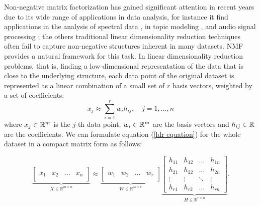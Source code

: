 Non-negative matrix factorization has gained significant attention in recent years due to its wide range of applications in data analysis, for instance it find applications in the analysis of spectral data \cite{boardman1995mapping}, in topic modeling \cite{arora2013practical}, and audio signal processing \cite{fevotte2009nonnegative}; the others traditional linear dimensionality reduction techniques often fail to capture non-negative structures inherent in many datasets. NMF provides a natural framework for this task.
In linear dimensionality reduction problems, that is, finding a low-dimensional representation of the data that is close to the underlying structure, 
each data point of the original dataset is represented as a linear combination of a small set of $r$ basis vectors, weighted by a set of coefficients:
\begin{equation}\label{ldr equation}
    x_j \approx \sum_{i=1}^r w_i h_{ij}, \quad j = 1, \dots, n
\end{equation}
where $x_j \in \mathbb{R}^m$ is the $j$-th data point, $w_i \in \mathbb{R}^m$ are the basis vectors and $h_{ij} \in \mathbb{R}$ are the coefficients.
We can formulate equation (\ref{ldr equation}) for the whole dataset in a compact matrix form as follows:

\begin{equation}\label{ldr matrix equation}
\underbrace{\begin{bmatrix}
& & & \\
x_1 & x_2 & \dots & x_n \\
& & & 
\end{bmatrix}}_{X \in \mathbb{R}^{m \times n}}
\approx
\underbrace{\begin{bmatrix}
& & & \\
w_1 & w_2 & \dots & w_r \\
& & & 
\end{bmatrix}}_{W \in \mathbb{R}^{m \times r}}
\underbrace{\begin{bmatrix}
h_{11} & h_{12} & \dots & h_{1n} \\
h_{21} & h_{22} & \dots & h_{2n} \\
\vdots & \vdots & \ddots & \vdots \\
h_{r1} & h_{r2} & \dots & h_{rn}
\end{bmatrix}}_{H \in \mathbb{R}^{r \times n}}.
\end{equation}

